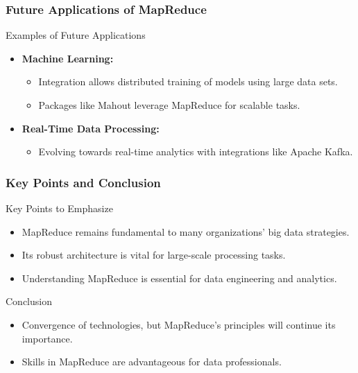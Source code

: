 \documentclass[aspectratio=169]{beamer}
\begin{document}
\begin{frame}[fragile]
    \frametitle{Future Applications of MapReduce}
    \begin{block}{Examples of Future Applications}
        \begin{itemize}
            \item \textbf{Machine Learning:}
            \begin{itemize}
                \item Integration allows distributed training of models using large data sets.
                \item Packages like Mahout leverage MapReduce for scalable tasks.
            \end{itemize}
            \item \textbf{Real-Time Data Processing:}
            \begin{itemize}
                \item Evolving towards real-time analytics with integrations like Apache Kafka.
            \end{itemize}
        \end{itemize}
    \end{block}
\end{frame}

\begin{frame}[fragile]
    \frametitle{Key Points and Conclusion}
    \begin{block}{Key Points to Emphasize}
        \begin{itemize}
            \item MapReduce remains fundamental to many organizations' big data strategies.
            \item Its robust architecture is vital for large-scale processing tasks.
            \item Understanding MapReduce is essential for data engineering and analytics.
        \end{itemize}
    \end{block}
    \begin{block}{Conclusion}
        \begin{itemize}
            \item Convergence of technologies, but MapReduce's principles will continue its importance.
            \item Skills in MapReduce are advantageous for data professionals.
        \end{itemize}
    \end{block}
\end{frame}
\end{document}
